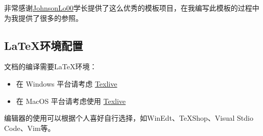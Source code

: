 非常感谢\href{https://github.com/JohnsonLo00}{JohnsonLo00}学长提供了这么优秀的模板项目，在我编写此模板的过程中为我提供了很多的参照。

\subsection{\LaTeX 环境配置}

文档的编译需要\LaTeX 环境：

\begin{itemize}
  \item 在 Windows 平台请考虑 \href{https://mirrors.tuna.tsinghua.edu.cn/CTAN/systems/texlive/Images/}{Texlive}
  \item 在 MacOS 平台请考虑使用 \href{https://mirrors.tuna.tsinghua.edu.cn/CTAN/systems/texlive/Images/}{Texlive}
\end{itemize}

编辑器的使用可以根据个人喜好自行选择，如WinEdt、TeXShop、Visual Stdio Code、Vim等。
